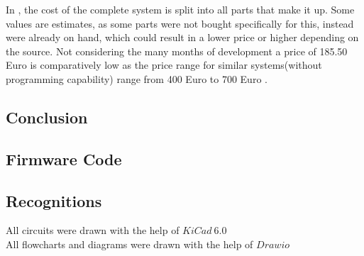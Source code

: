 \noindent In , the cost of the complete system is split into all parts that make it up. Some values are estimates, as some parts were not bought specifically for this, instead were already on hand, which could result in a lower price or higher depending on the source. Not considering the many months of development a price of 185.50 Euro is comparatively low as the price range for similar systems(without programming capability) range from 400 Euro  to 700 Euro . \\

\subsection{Conclusion}


\pagebreak

\subsection{Firmware Code}



\vspace{2cm}

\subsection{Recognitions}
\label{Recognitions}
All circuits were drawn with the help of $KiCad\ 6.0$\\

\noindent All flowcharts and diagrams were drawn with the help of $Drawio$
